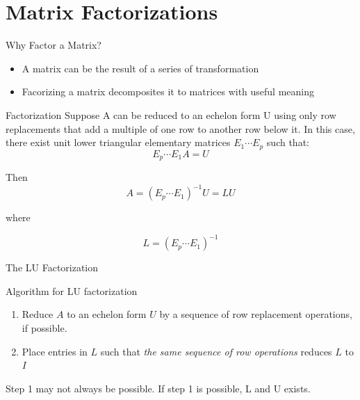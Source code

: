 \section[Factorizations]{Matrix Factorizations}

\newcommand{\pivotentry}[1]{\colorbox{blue!15}{\(\mathstrut #1\)}}

\begin{frame}{Why Factor a Matrix?}
  \begin{itemize}
    \item A matrix can be the result of a series of transformation
    \item Facorizing a matrix decomposites it to matrices with useful meaning
  \end{itemize}

  \begin{block}{Factorization}
    Suppose A can be reduced to an echelon form U using only row replacements that add a
multiple of one row to another row below it. In this case, there exist unit lower triangular
elementary matrices $E_1 \cdots E_p$ such that:
\[E_p \cdots E_1A = U \]

Then
\[A = (E_p \cdots E_1)^{-1}U = LU\]

where

\[L = (E_p \cdots E_1)^{-1}\]


  \end{block}
\end{frame}

\begin{frame}{The LU Factorization}
\begin{block}{Algorithm for LU factorization}
  \begin{enumerate}
    \item Reduce $A$ to an echelon form $U$ by a sequence of row replacement operations, if possible.
    \item Place entries in $L$ such that \textit{the same sequence of row operations} reduces $L$ to $I$
  \end{enumerate}
\end{block}

Step 1 may not always be possible. If step 1 is possible, L and U exists.
\end{frame}

